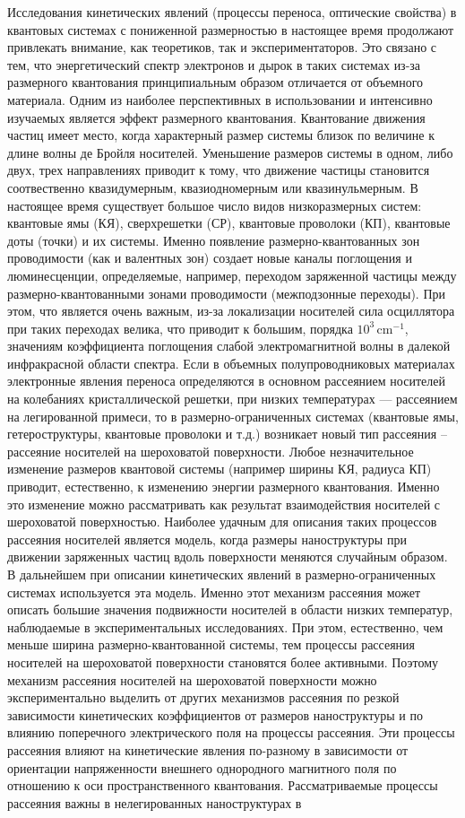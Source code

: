 {\actuality}
Исследования кинетических явлений (процессы переноса, оптические свойства) в квантовых системах с пониженной размерностью в настоящее время продолжают привлекать внимание, как теоретиков, так и экспериментаторов. Это связано с тем, что энергетический спектр электронов и дырок в таких системах из-за размерного квантования принципиальным образом отличается от объемного материала. Одним из наиболее перспективных в использовании и интенсивно изучаемых является эффект размерного квантования. Квантование движения частиц имеет место, когда характерный размер системы близок по величине к длине волны де Бройля носителей. Уменьшение размеров системы в одном, либо двух, трех направлениях приводит к тому, что движение частицы становится соотвественно квазидумерным, квазиодномерным или квазинульмерным. В настоящее время существует большое число видов низкоразмерных систем: квантовые ямы (КЯ), сверхрешетки (СР), квантовые проволоки (КП), квантовые доты (точки) и их системы. Именно появление размерно-квантованных зон проводимости (как и валентных зон) создает новые каналы поглощения и люминесценции, определяемые, например, переходом заряженной частицы между размерно-квантованными зонами проводимости (межподзонные переходы). При этом, что является очень важным, из-за локализации носителей сила осциллятора при таких переходах велика, что приводит к большим, порядка $10^3\,\text{cm}^{-1}$, значениям коэффициента поглощения слабой электромагнитной волны в далекой инфракрасной области спектра. Если в объемных полупроводниковых материалах электронные явления переноса определяются в основном рассеянием носителей на колебаниях кристаллической решетки, при низких температурах --- рассеянием на легированной примеси, то в размерно-ограниченных системах (квантовые ямы, гетероструктуры, квантовые проволоки и т.д.) возникает новый тип рассеяния – рассеяние носителей на шероховатой поверхности. Любое незначительное изменение размеров квантовой системы (например ширины КЯ, радиуса КП) приводит, естественно, к изменению энергии размерного квантования. Именно это изменение можно рассматривать как результат взаимодействия носителей с шероховатой поверхностью. Наиболее удачным для описания таких процессов рассеяния носителей является модель, когда размеры наноструктуры при движении заряженных частиц вдоль поверхности меняются случайным образом. В дальнейшем при описании кинетических явлений в размерно-ограниченных системах используется эта модель. Именно этот механизм рассеяния может описать большие значения подвижности носителей в области низких температур, наблюдаемые в экспериментальных исследованиях. При этом, естественно, чем меньше ширина размерно-квантованной системы, тем процессы рассеяния носителей на шероховатой поверхности становятся более активными. Поэтому механизм рассеяния носителей на шероховатой поверхности можно экспериментально выделить от других механизмов рассеяния по резкой зависимости кинетических коэффициентов от размеров наноструктуры и по влиянию поперечного электрического поля на процессы рассеяния. Эти процессы рассеяния влияют на кинетические явления по-разному в зависимости от ориентации напряженности внешнего однородного магнитного поля по отношению к оси пространственного квантования. Рассматриваемые процессы рассеяния важны в нелегированных наноструктурах в 